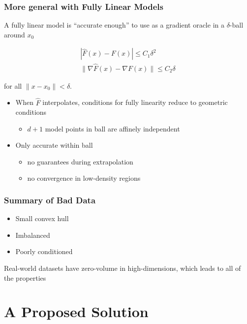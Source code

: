 \documentclass[aspectratio=169]{beamer}
\begin{document}
\begin{frame}\frametitle{More general with Fully Linear Models}

\pause
A fully linear model is ``accurate enough'' to use as a gradient oracle
in a $\delta$-ball around $x_0$

\pause
$$
\begin{array}{c}
|{\hat F}(x)-F(x)| \leq C_1 \delta^2\\
\| \nabla {\hat F}(x) - \nabla F(x)\| \leq C_2 \delta
\end{array}
$$

for all $\|x - x_0\| < \delta$.

\pause
\begin{itemize}
\item When ${\hat F}$ interpolates, conditions for fully linearity
reduce to geometric conditions
\begin{itemize}
\item $d+1$ model points in ball are affinely independent
\end{itemize}
\item Only accurate within ball
\begin{itemize}
\item no guarantees during extrapolation
\item no convergence in low-density regions
\end{itemize}
\end{itemize}
\end{frame}

\begin{frame}\frametitle{Summary of Bad Data}
\begin{itemize}
\item Small convex hull
\item Imbalanced
\item Poorly conditioned
\end{itemize}

\bigskip
\pause

Real-world datasets have zero-volume in high-dimensions, which leads to
all of the properties

\end{frame}

\section{A Proposed Solution}
\end{document}
